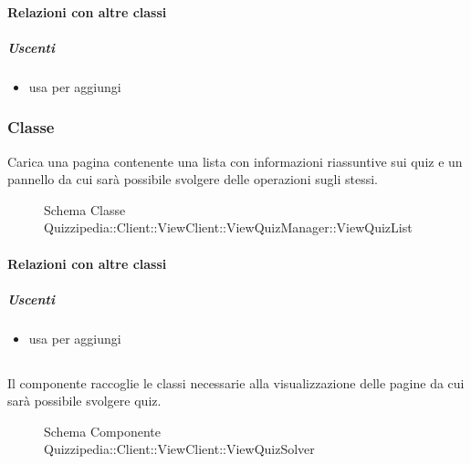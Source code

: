 \paragraph{Relazioni con altre classi}
\subparagraph{Uscenti}
\begin{itemize}
\item usa  per aggiungi
\end{itemize}
\subsubsection{Classe }
Carica una pagina contenente una lista con informazioni riassuntive sui quiz e un pannello da cui sarà possibile svolgere delle operazioni sugli stessi.
\begin{figure}[H]
\centering
\noindent{}
\caption[Schema Classe ViewQuizList]{Schema Classe Quizzipedia::Client::ViewClient::ViewQuizManager::ViewQuizList}
\end{figure}
\paragraph{Relazioni con altre classi}
\subparagraph{Uscenti}
\begin{itemize}
\item usa  per aggiungi
\end{itemize}
\subsection{}
Il componente raccoglie le classi necessarie alla visualizzazione delle pagine da cui sarà possibile svolgere quiz.
\begin{figure}[H]
\centering
\noindent{}
\caption[Schema Componente Quizzipedia::Client::ViewClient::ViewQuizSolver]{Schema Componente Quizzipedia::Client::ViewClient::ViewQuizSolver}
\end{figure}

